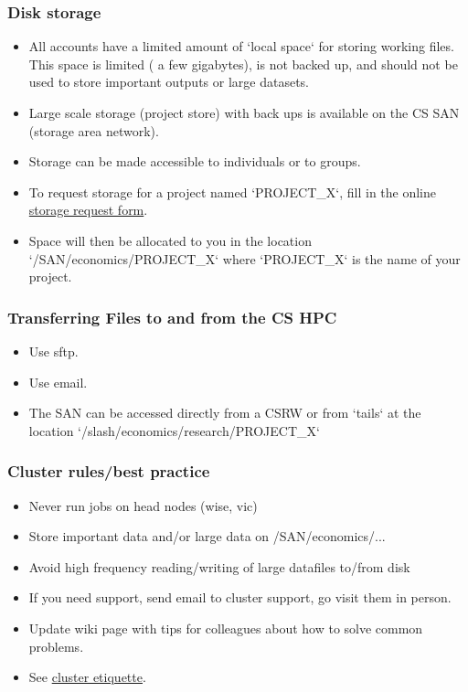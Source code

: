 \documentclass{beamer}
\begin{document}
\begin{frame}
\frametitle{Disk storage}
\begin{itemize}
\item All accounts have a limited amount of `local space` for storing working files. This space is limited ( a few gigabytes), is not backed up, and should not be used to store important outputs or large datasets.
\item Large scale storage (project store) with back ups is available on the CS SAN (storage area network).
\item Storage can be made accessible to individuals or to groups. 
\item To request storage for a project named `PROJECT\_X`, fill in the online \textcolor{blue}{\href{http://hpc.cs.ucl.ac.uk/file\_systems\_storage/cluster\_storage\_request\_form}{storage request form}}.
\item Space will then be allocated to you in the location `/SAN/economics/PROJECT\_X` where `PROJECT\_X` is the name of your project.
\end{itemize}
\end{frame}

\begin{frame}
\frametitle{Transferring Files to and from the CS HPC}
\begin{itemize}
\item Use sftp.
\item Use email.
\item The SAN can be accessed directly from a CSRW or from `tails` at the location `/slash/economics/research/PROJECT\_X`
\end{itemize}
\end{frame}

\begin{frame}
\frametitle{Cluster rules/best practice}
\begin{itemize}
\item Never run jobs on head nodes (wise, vic)
\item Store important data and/or large data on /SAN/economics/...
\item Avoid high frequency reading/writing of large datafiles to/from disk
\item If you need support, send email to cluster support, go visit them in person.
\item Update wiki page with tips for colleagues about how to solve common problems.
\item See \textcolor{blue}{ \href{http://hpc.cs.ucl.ac.uk/cluster\_etiquette}{cluster etiquette}}.
\end{itemize}
\end{frame}
\end{document}
